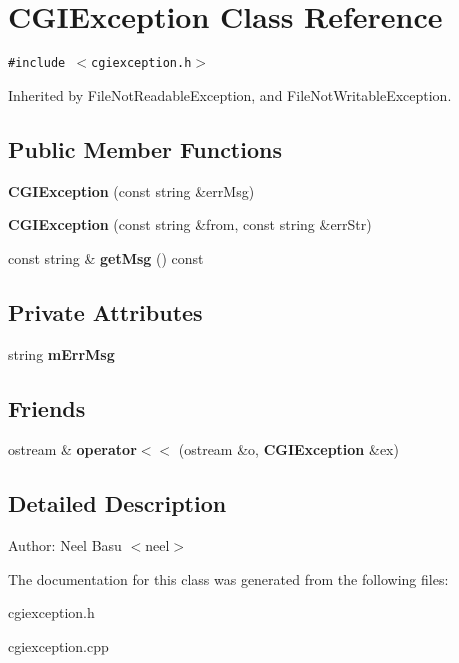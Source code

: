 \section{CGIException Class Reference}
\label{classCGIException}
{\tt \#include $<$cgiexception.h$>$}

Inherited by FileNotReadableException, and FileNotWritableException.

\subsection*{Public Member Functions}
\begin{CompactItemize}
\item 
\textbf{CGIException} (const string \&errMsg)\label{classCGIException_f53d72a8212748d248149d52e0bdce37}

\item 
\textbf{CGIException} (const string \&from, const string \&errStr)\label{classCGIException_cb06b9baf52d90d4af08ebe9f45a89eb}

\item 
const string \& \textbf{getMsg} () const \label{classCGIException_a23e3d6c37bdb51e61ef3a0a9f37a96f}

\end{CompactItemize}
\subsection*{Private Attributes}
\begin{CompactItemize}
\item 
string \textbf{mErrMsg}\label{classCGIException_140051f4ca5601941ec7be922da06d1c}

\end{CompactItemize}
\subsection*{Friends}
\begin{CompactItemize}
\item 
ostream \& \textbf{operator$<$$<$} (ostream \&o, {\bf CGIException} \&ex)\label{classCGIException_83dbc37442acdd6c18caa70a82be95e1}

\end{CompactItemize}


\subsection{Detailed Description}
\begin{Desc}
\item[Author:]Neel Basu $<$neel$>$ \end{Desc}


The documentation for this class was generated from the following files:\begin{CompactItemize}
\item 
cgiexception.h\item 
cgiexception.cpp\end{CompactItemize}
